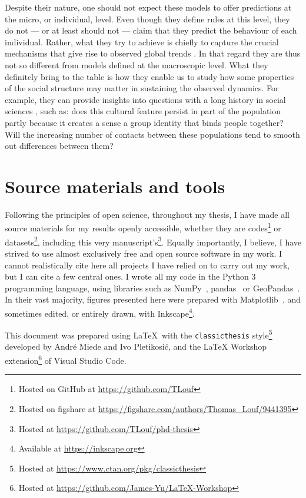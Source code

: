 \documentclass[../thesis.tex]{subfiles}
\begin{document}
Despite their nature, one should not expect these models to offer predictions at the
micro, or individual, level. Even though they define rules at this level, they do not
--- or at least should not --- claim that they predict the behaviour of each individual.
Rather, what they try to achieve is chiefly to capture the crucial mechanisms that give
rise to observed global trends \cite{MacyFactorsActors2002}. In that regard they are
thus not so different from models defined at the macroscopic level. What they definitely
bring to the table is how they enable us to study how some properties of the social
structure may matter in sustaining the observed dynamics. For example, they can provide
insights into questions with a long history in social sciences
\cite{LatanePsychologySocial1981}, such as: does this cultural feature persist in part
of the population partly because it creates a sense a group identity that binds people
together? Will the increasing number of contacts between these populations tend to
smooth out differences between them?


\section{Source materials and tools}
Following the principles of open science, throughout my thesis, I have made all source
materials for my results openly accessible, whether they are codes\footnote{Hosted on
GitHub at \url{https://github.com/TLouf}} or datasets\footnote{Hosted on figshare at
\url{https://figshare.com/authors/Thomas_Louf/9441395}}, including this very
manuscript's\footnote{Hosted at \url{https://github.com/TLouf/phd-thesis}}. Equally importantly, I believe, I have strived to use almost exclusively free
and open source software in my work. I cannot realistically cite here all projects I
have relied on to carry out my work, but I can cite a few central ones. I wrote all my
code in the Python 3 programming language, using libraries such as
NumPy~\cite{HarrisArrayProgramming2020},
pandas~\cite{teamPandasdevPandas2020} or
GeoPandas~\cite{JordahlGeopandasGeopandas2020}. In their vast majority, figures
presented here were prepared with Matplotlib~\cite{HunterMatplotlib2D2007}, and
sometimes edited, or entirely drawn, with Inkscape\footnote{Available at
\url{https://inkscape.org}}.

This document was prepared using \LaTeX\ with the \texttt{classicthesis}
style\footnote{Hosted at \url{https://www.ctan.org/pkg/classicthesis}} developed by
Andr\'e Miede and Ivo Pletikosić, and the LaTeX Workshop extension\footnote{Hosted at
\url{https://github.com/James-Yu/LaTeX-Workshop}} of Visual Studio Code.
\end{document}
